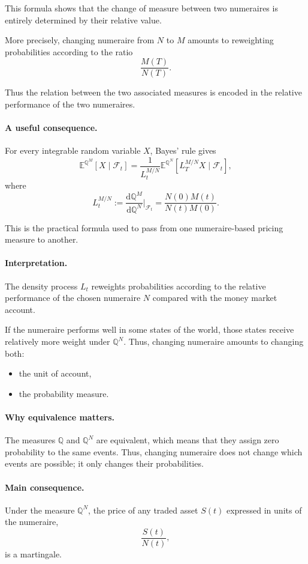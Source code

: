 \documentclass[11pt]{article}
\newcommand{\F}{\mathcal{F}}
\newcommand{\Qbb}{\mathbb{Q}}
\newcommand{\E}{\mathbb{E}}
\theoremstyle{definition}
\theoremstyle{plain}
\begin{document}
This formula shows that the change of measure between two numeraires is
entirely determined by their relative value.

More precisely, changing numeraire from \(N\) to \(M\) amounts to
reweighting probabilities according to the ratio
\[
\frac{M(T)}{N(T)}.
\]

Thus the relation between the two associated measures is encoded in the
relative performance of the two numeraires.

\paragraph{A useful consequence.}

For every integrable random variable \(X\), Bayes' rule gives
\[
\E^{\Qbb^M}[X\mid\F_t]
=
\frac{1}{L_t^{M/N}}
\E^{\Qbb^N}[L_T^{M/N}X\mid\F_t],
\]
where
\[
L_t^{M/N}
:=
\frac{\mathrm{d}\Qbb^M}{\mathrm{d}\Qbb^N}\Big|_{\F_t}
=
\frac{N(0)M(t)}{N(t)M(0)}.
\]

This is the practical formula used to pass from one numeraire-based
pricing measure to another.

\paragraph{Interpretation.}
The density process \(L_t\) reweights probabilities according to the
relative performance of the chosen numeraire \(N\) compared with the
money market account.

If the numeraire performs well in some states of the world, those states
receive relatively more weight under \(\Qbb^N\).
Thus, changing numeraire amounts to changing both:
\begin{itemize}[leftmargin=1.4em]
\item the unit of account,
\item the probability measure.
\end{itemize}

\paragraph{Why equivalence matters.}
The measures \(\Qbb\) and \(\Qbb^N\) are equivalent, which means that
they assign zero probability to the same events.
Thus, changing numeraire does not change which events are possible; it
only changes their probabilities.

\paragraph{Main consequence.}
Under the measure \(\Qbb^N\), the price of any traded asset \(S(t)\)
expressed in units of the numeraire,
\[
\frac{S(t)}{N(t)},
\]
is a martingale.
\end{document}
